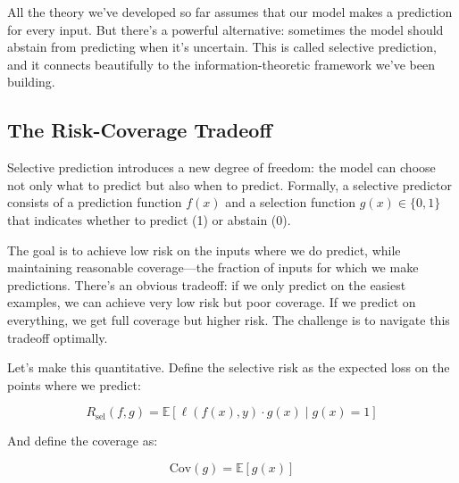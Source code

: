 \vspace{0.8em}

All the theory we've developed so far assumes that our model makes a prediction for every input. But there's a powerful alternative: sometimes the model should abstain from predicting when it's uncertain. This is called selective prediction, and it connects beautifully to the information-theoretic framework we've been building.

\vspace{1em}

\subsection{The Risk-Coverage Tradeoff}

Selective prediction introduces a new degree of freedom: the model can choose not only what to predict but also when to predict. Formally, a selective predictor consists of a prediction function $f(x)$ and a selection function $g(x) \in \{0, 1\}$ that indicates whether to predict (1) or abstain (0).

\vspace{0.3cm}

The goal is to achieve low risk on the inputs where we do predict, while maintaining reasonable coverage---the fraction of inputs for which we make predictions. There's an obvious tradeoff: if we only predict on the easiest examples, we can achieve very low risk but poor coverage. If we predict on everything, we get full coverage but higher risk. The challenge is to navigate this tradeoff optimally.

\vspace{0.3cm}

Let's make this quantitative. Define the selective risk as the expected loss on the points where we predict:

\vspace{0.3cm}

\begin{equation}
R_{\text{sel}}(f,g) = \mathbb{E}[\ell(f(x), y) \cdot g(x) \mid g(x) = 1]
\end{equation}

\vspace{0.3cm}

And define the coverage as:

\vspace{0.3cm}

\begin{equation}
\text{Cov}(g) = \mathbb{E}[g(x)]
\end{equation}

